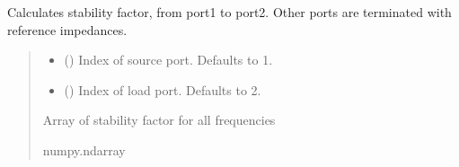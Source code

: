 \documentclass[letterpaper,10pt,english]{sphinxmanual}
\begin{document}
\begin{fulllineitems}
\begin{fulllineitems}
\end{fulllineitems}


\begin{fulllineitems}
\label{\detokenize{touchstone:touchstone.spfile.stability_factor_k}}
\pysigstartsignatures
{}
\pysigstopsignatures
\sphinxAtStartPar
Calculates  stability factor, from port1 to port2. Other ports are terminated with reference impedances.
\begin{quote}\begin{description}
\begin{itemize}
\item {} 
\sphinxAtStartPar
{} (\sphinxstyleliteralemphasis{\sphinxupquote{, }}) \textendash{} Index of source port. Defaults to 1.

\item {} 
\sphinxAtStartPar
{} (\sphinxstyleliteralemphasis{\sphinxupquote{, }}) \textendash{} Index of load port. Defaults to 2.

\end{itemize}

\sphinxAtStartPar
Array of stability factor for all frequencies

\sphinxAtStartPar
numpy.ndarray

\end{description}\end{quote}

\end{fulllineitems}



\end{fulllineitems}
\end{document}
